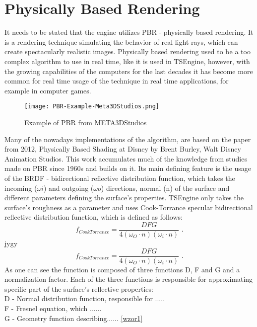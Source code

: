 \newpage
\section{Physically Based Rendering}
It needs to be stated that the engine utilizes PBR - physically based rendering. It is a rendering technique simulating the behavior of real light rays, which can create spectacularly realistic images. Physically based rendering used to be a too complex algorithm to use in real time, like it is used in TSEngine, however, with the growing capabilities of the computers for the last decades it has become more common for real time usage of the technique in real time applications, for example in computer games.

\begin{figure}
    \texttt{[image: PBR-Example-Meta3DStudios.png]}
    \caption{Example of PBR from META3DStudios}
\end{figure}

Many of the nowadays implementations of the algorithm, are based on the paper from 2012, Physically Based Shading at Disney by Brent Burley, Walt Disney Animation Studios. This work accumulates much of the knowledge from studies made on PBR since 1960s and builds on it. Its main defining feature is the usage of the BRDF - bidirectional reflective distribution function, which takes the incoming ($\omega i$) and outgoing ($\omega o$) directions, normal (n) of the surface and different parameters defining the surface's properties. TSEngine only takes the surface's roughness as a parameter and uses Cook-Torrance specular bidirectional reflective distribution function, which is defined as follows:
\begin{equation}
f_{CookTorrance}=\frac{DFG}{4(\omega_{O} \cdot n)(\omega_{i} \cdot n)}
\text{ .}
\label{wzor1}
\end{equation}
jygy
\begin{equation}
f_{CookTorrance}=\frac{DFG}{4(\omega_{O} \cdot n)(\omega_{i} \cdot n)}
\text{ .}
\end{equation}
As one can see the function is composed of three functions D, F and G and a normalization factor. Each of the three functions is responsible for approximating specific part of the surface's reflective properties:\\
D - Normal distribution function, responsible for ..... \\
F - Fresnel equation, which ......\\
G - Geometry function describing......
\ref{wzor1}

